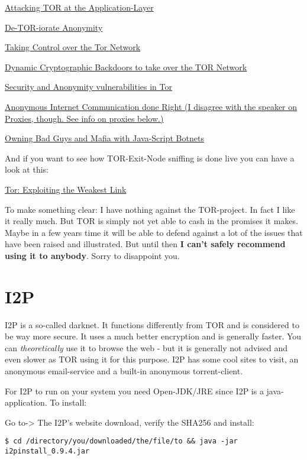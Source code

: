\documentclass{article}
\begin{document}
 \href{http://youtu.be/lhB8k2iTe-s}{Attacking TOR at the Application-Layer}


\href{http://youtu.be/RS2gKjf3Ys4}{De-TOR-iorate Anonymity}


\href{http://youtu.be/CD1X_k7Lf64}{Taking Control over the Tor Network}


\href{http://youtu.be/7We3aRb0tSg}{Dynamic Cryptographic Backdoors to take over the TOR Network}


\href{http://youtu.be/GinCJNgY7o4}{Security and Anonymity vulnerabilities in Tor}


\href{http://youtu.be/xzFA8Im4iA4}{Anonymous Internet Communication done Right (I disagree with the speaker on Proxies, though. See info on proxies below.)}


\href{http://youtu.be/kLt_uqSCEUA}{Owning Bad Guys and Mafia with Java-Script Botnets}


 And if you want to see how TOR-Exit-Node sniffing is done live you can have a look at this: 


\href{http://youtu.be/qEb5L9VbYNM}{Tor: Exploiting the Weakest Link}


 To make something clear: I have nothing against the TOR-project. In fact I like it really much. But TOR is simply not yet able to cash in the promises it makes. Maybe in a few years time it will be able to defend against a lot of the issues that have been raised and illustrated. But until then \textbf{I can't safely recommend using it to anybody}. Sorry to disappoint you.
\section{I2P}


 I2P is a so-called darknet. It functions differently from TOR and is considered to be way more secure. It uses a much better encryption and is generally faster. You can \emph{theoretically} use it to browse the web - but it is generally not advised and even slower as TOR using it for this purpose. I2P has some cool sites to visit, an anonymous email-service and a built-in anonymous torrent-client. 


 For I2P to run on your system you need Open-JDK/JRE since I2P is a java-application. To install: 


 Go to-> The I2P's website download, verify the SHA256 and install:
\begin{lstlisting}
$ cd /directory/you/downloaded/the/file/to && java -jar i2pinstall_0.9.4.jar
\end{lstlisting}
\end{document}
